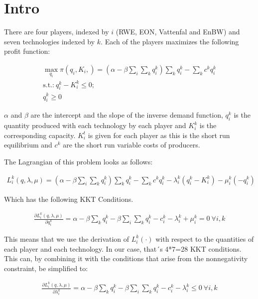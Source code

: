 \documentclass[a4paper,12pt]{article}
\theoremstyle{remark}
\begin{document}
  \section{Intro}

There are four players, indexed by $i$ (RWE, EON, Vattenfal and EnBW) and seven technologies indexed by $k$. Each of the players maximizes the following profit function:

\begin{gather}
	\max_{q_i} \pi(q_i,K_i,)= (\alpha-\beta\sum_i \sum_k q_i^k ) \sum_k q_i^k - \sum_k c^k q_i^k  \\
			\text{s.t.:} \  q_i^k-K_i^k \leq 0; \\  \nonumber
 										  q_i^k	\geq 0  \nonumber
\end{gather}

$\alpha$ and $\beta$ are the intercept and the slope of the inverse demand function, $q_i^k$ is the quantity produced with each technology by each player and $K_i^k$ is the corresponding capacity. $K_i^t$ is given for each player as this is the short run equilibrium and $c^k$ are the short run variable costs of producers.

The Lagrangian of this problem looks as follows:

\begin{gather}
	L_i^k(q,\lambda,\mu)= (\alpha-\beta\sum_i \sum_k q_i^k ) \sum_k q_i^k - \sum_k c^k q_i^k - \lambda_i^k (q_i^k-K_i^k)-\mu_i^k(-q_i^k)
\end{gather}

Which has the following KKT Conditions. 

\begin{gather}
\frac{\partial L_i^k(q,\lambda,\mu)}{\partial q_i^k}	= \alpha - \beta \sum_k q_i^k - \beta\sum_i \sum_k q_i^k - c_i^k - \lambda_i^k + \mu_i^k = 0 \ \forall i,k
\end{gather}

This means that we use the derivation of $L_i^k(\cdot)$ with respect to the quantities of each player and each technology. In our case, that´s 4*7=28 KKT conditions. This can, by combining it with the conditions that arise from the nonnegativity constraint, be simplified to:

\begin{gather}
\frac{\partial L_i^k(q,\lambda,\mu)}{\partial \lambda_i^k}	= \alpha - \beta \sum_k q_i^k - \beta\sum_i \sum_k q_i^k - c_i^k - \lambda_i^k \leq 0 \ \forall i,k
\end{gather}
\end{document}

